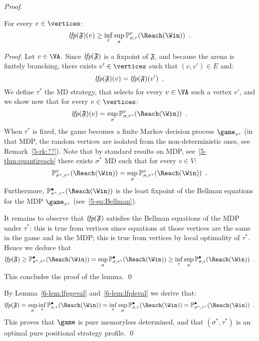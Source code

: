 \begin{proof}
  \begin{lemma}
    \label{6-lem:lfpleval}
    For every $v \in \vertices$:
    \[
    \lfp(\mathfrak{F})(v) \ge \inf_\tau \sup_\sigma
    \probm_{\sigma,\tau}^v(\Reach(\Win)) \enspace.
    \]
  \end{lemma}

  \begin{proof}
    Let $v \in \VA$. Since $\textit{lfp}(\mathfrak{F})$ is a fixpoint of
    $\mathfrak{F}$, and because the arena is finitely branching, there exists $v'\in \vertices$ such
    that $(v,v') \in E$ and:
    \[
      \textit{lfp}(\mathfrak{F})(v) = \textit{lfp}(\mathfrak{F})(v') \enspace.
    \]
    We define $\tau^*$ the MD strategy, that selects for every
    $v\in \VA$ such a vertex $v'$, and we show now that for every
    $v \in \vertices$:
    \[
    \lfp(\mathfrak{F})(v) = \sup_\sigma
    \probm_{\sigma,\tau^*}^v(\Reach(\Win)) \enspace.
    \]
    When $\tau^*$ is fixed, the game becomes a finite Markov decision
    process $\game_{\tau^*}$ (in that MDP, the random vertices are
    isolated from the non-deterministic ones, see
    Remark~\ref{5-rk:??}). Note that by standard results on MDP,
    see~\ref{5-thm:quantireach} there exists $\sigma^*$ MD such that
    for every $v \in V$:
    \[
    \probm_{\sigma^*,\tau^*}^v(\Reach(\Win)) = \sup_\sigma
    \probm_{\sigma,\tau^*}^v(\Reach(\Win)) \enspace.
    \]
    Furthermore, $\probm_{\sigma^*,\tau^*}^\bullet(\Reach(\Win))$ is
    the least fixpoint of the Bellman equations for the MDP
    $\game_{\tau^*}$ (see~\ref{5-eq:Bellman}).
    
    It remains to observe that $\textit{lfp}(\mathfrak{F})$ satisfies the
    Bellman equations of the MDP under $\tau^*$: this is true from
    \Eve vertices since equations at those vertices are the same in
    the game and in the MDP; this is true from \Adam vertices by local
    optimality of $\tau^*$. Hence we deduce that
    \[
      \lfp(\mathfrak{F}) \ge
      \probm_{\sigma^*,\tau^*}^\bullet(\Reach(\Win)) = \sup_\sigma
      \probm_{\sigma,\tau^*}^\bullet(\Reach(\Win)) \ge \inf_\tau
      \sup_\sigma \probm_{\sigma,\tau}^\bullet(\Reach(\Win)) \enspace.
    \]
    This concludes the proof of the lemma. \qed
  \end{proof}
By Lemma~\ref{6-lem:lfpgeval} and~\ref{6-lem:lfpleval}  we derive that:
 \[
   \lfp(\mathfrak{F}) =
   \sup_\sigma \inf_\tau 
    \probm_{\sigma,\tau}^\bullet(\Reach(\Win)) =  \inf_\tau \sup_\sigma
   \probm_{\sigma,\tau}^\bullet(\Reach(\Win)) = 
   \probm_{\sigma^*,\tau^*}^\bullet(\Reach(\Win)) \enspace.
  \]
  This proves that $\game$ is pure memoryless determined, and that
  $(\sigma^*,\tau^*)$ is an optimal pure positional strategy profile.
  \qed 
\end{proof}

